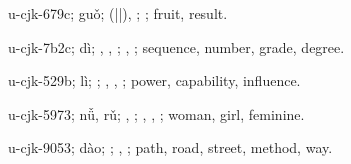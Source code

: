 \begin{multicols}{2}
{\cjkgGlue{}u-cjk-679c; guǒ; \cjkgGlue{}\cjkgGlue{}(\cjkgGlue{}|\cjkgGlue{}|\cjkgGlue{}), \cjkgGlue{}\cjkgGlue{}\cjkgGlue{}; \cjkgGlue{}; fruit, result.

\cjkgGlue{}u-cjk-7b2c; dì; \cjkgGlue{}, \cjkgGlue{}, \cjkgGlue{}; \cjkgGlue{}, \cjkgGlue{}; sequence, number, grade, degree.

\cjkgGlue{}u-cjk-529b; lì; \cjkgGlue{}; \cjkgGlue{}, \cjkgGlue{}, \cjkgGlue{}; power, capability, influence.

\cjkgGlue{}u-cjk-5973; nǚ, rǔ; \cjkgGlue{}, \cjkgGlue{}; \cjkgGlue{}, \cjkgGlue{}, \cjkgGlue{}; woman, girl, feminine.

\cjkgGlue{}u-cjk-9053; dào; \cjkgGlue{}; \cjkgGlue{}, \cjkgGlue{}; path, road, street, method, way.

}
\end{multicols}
